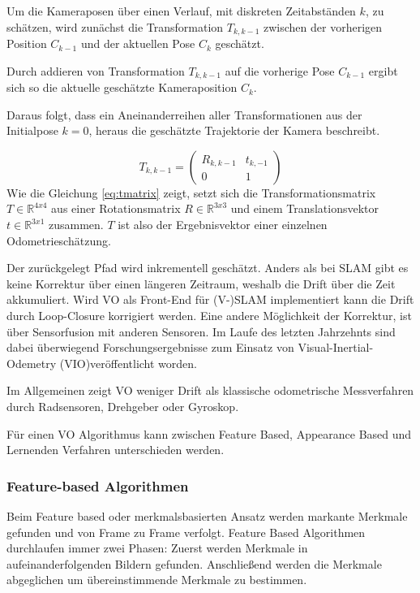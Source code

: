 Um die Kameraposen über einen Verlauf, mit diskreten Zeitabständen $k$, zu schätzen, wird zunächst die Transformation $T_{k,k-1}$ zwischen der vorherigen Position $C_{k-1}$ und der aktuellen Pose $C_{k}$ geschätzt.


Durch addieren von Transformation $T_{k,k-1}$ auf die vorherige Pose $C_{k-1}$ ergibt sich so die aktuelle geschätzte Kameraposition $C_{k}$.

Daraus folgt, dass ein Aneinanderreihen aller Transformationen aus der Initialpose $k = 0$, heraus die geschätzte Trajektorie der Kamera beschreibt.

\begin{equation}
\label{eq:tmatrix2}
T_{k,k-1} = 
    \begin{pmatrix}
    R_{k,k-1} & t_{k,-1}\\
    0 & 1
    \end{pmatrix}
\end{equation}
Wie die Gleichung \ref{eq:tmatrix} zeigt, setzt sich die Transformationsmatrix $T \in \mathbb{R}^{4x4}$ aus einer Rotationsmatrix $R \in \mathbb{R}^{3x3}$ und einem Translationsvektor $t \in \mathbb{R}^{3x1}$ zusammen. $T$ ist also der Ergebnisvektor einer einzelnen Odometrieschätzung.
\newline

Der zurückgelegt Pfad wird inkrementell geschätzt. Anders als bei SLAM gibt es keine Korrektur über einen längeren Zeitraum, weshalb die Drift über die Zeit akkumuliert. Wird VO als Front-End für (V-)SLAM implementiert kann die Drift durch Loop-Closure korrigiert werden. Eine andere Möglichkeit der Korrektur, ist über  Sensorfusion mit anderen Sensoren. Im Laufe des letzten Jahrzehnts sind dabei überwiegend Forschungsergebnisse zum Einsatz von Visual-Inertial-Odemetry (VIO)veröffentlicht worden.

Im Allgemeinen zeigt VO weniger Drift als klassische odometrische Messverfahren durch Radsensoren, Drehgeber oder Gyroskop.\cite{ScFrVO}

Für einen VO Algorithmus kann zwischen Feature Based, Appearance Based und Lernenden Verfahren unterschieden werden. 

\subsubsection{Feature-based Algorithmen}
Beim Feature based oder merkmalsbasierten Ansatz werden markante Merkmale gefunden und von Frame zu Frame verfolgt. Feature Based Algorithmen durchlaufen immer zwei Phasen: Zuerst werden Merkmale in aufeinanderfolgenden Bildern gefunden. Anschlie{\ss}end werden die Merkmale abgeglichen um übereinstimmende Merkmale zu bestimmen.


